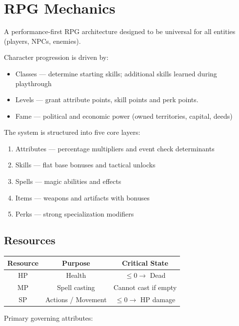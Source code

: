\section{RPG Mechanics}
\label{sec:RPG}

A performance-first RPG architecture designed to be universal for all entities (players, NPCs, enemies).

Character progression is driven by:

\begin{itemize}
\item Classes — determine starting skills; additional skills learned during playthrough
\item Levels — grant attribute points, skill points and perk points.
\item Fame — political and economic power (owned territories, capital, deeds)
\end{itemize}

The system is structured into five core layers:

\begin{enumerate}
\item Attributes — percentage multipliers and event check determinants
\item Skills — flat base bonuses and tactical unlocks
\item Spells — magic abilities and effects
\item Items — weapons and artifacts with bonuses
\item Perks — strong specialization modifiers
\end{enumerate}

\subsection{Resources}

\begin{table}[H]
\centering
\begin{tabular}{|c|c|c|}
\hline
Resource & Purpose & Critical State \\
\hline
HP & Health & $\leq 0 \rightarrow$ Dead \\
MP & Spell casting & Cannot cast if empty \\
SP & Actions / Movement & $\leq 0 \rightarrow$ HP damage \\
\hline
\end{tabular}
\end{table}

Primary governing attributes:

